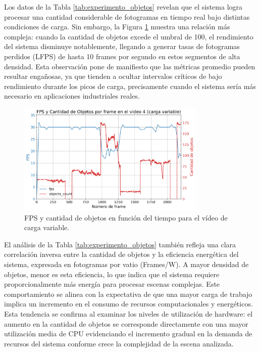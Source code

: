 \documentclass[11pt,spanish,listoffigures,listoftables]{tfgetsinf}
\begin{document}
Los datos de la Tabla \ref{tab:experimento_objetos} revelan que el sistema logra procesar una cantidad considerable de fotogramas en tiempo real bajo distintas condiciones de carga. Sin embargo, la Figura \ref{fig:fps_vs_object_count} muestra una relación más compleja: cuando la cantidad de objetos excede el umbral de 100, el rendimiento del sistema disminuye notablemente, llegando a generar tasas de fotogramas perdidos (LFPS) de hasta 10 frames por segundo en estos segmentos de alta densidad. Esta observación pone de manifiesto que las métricas promedio pueden resultar engañosas, ya que tienden a ocultar intervalos críticos de bajo rendimiento durante los picos de carga, precisamente cuando el sistema sería más necesario en aplicaciones industriales reales.

\begin{figure}
   \centering
   \includegraphics[width=0.8\textwidth]{excels/inferencia/cantidad_objetos/resultados/variable_fps_vs_object_count/fps_vs_object_count.png}
   \caption[FPS y cantidad de objetos en función del tiempo para el vídeo de carga variable]{FPS y cantidad de objetos en función del tiempo para el vídeo de carga variable.}
   \label{fig:fps_vs_object_count}
\end{figure}

El análisis de la Tabla \ref{tab:experimento_objetos} también refleja una clara correlación inversa entre la cantidad de objetos y la eficiencia energética del sistema, expresada en fotogramas por vatio (Frames/W). A mayor densidad de objetos, menor es esta eficiencia, lo que indica que el sistema requiere proporcionalmente más energía para procesar escenas complejas. Este comportamiento se alinea con la expectativa de que una mayor carga de trabajo implica un incremento en el consumo de recursos computacionales y energéticos. Esta tendencia se confirma al examinar los niveles de utilización de hardware: el aumento en la cantidad de objetos se corresponde directamente con una mayor utilización media de CPU evidenciando el incremento gradual en la demanda de recursos del sistema conforme crece la complejidad de la escena analizada.
\end{document}
